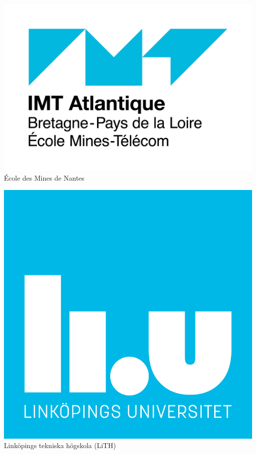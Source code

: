 \documentclass[11pt,a4paper,sans]{moderncv}}
\begin{document}
{  \hfill
  \begin{minipage}[t]{0.24\linewidth}
    \centering
    \includegraphics[width=0.8\linewidth]{../../../images/IMT_Atlantique_logo_1.png}\\
    \scriptsize École des Mines de Nantes
  \end{minipage}
  \hfill
  \begin{minipage}[t]{0.24\linewidth}
    \centering
    \includegraphics[width=0.9\linewidth]{../../../images/liu-logo.png}\\
    \scriptsize Linköpings tekniska högskola (LiTH)
  \end{minipage}
}

%
%

\end{document}
